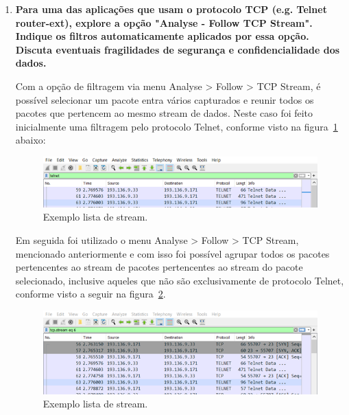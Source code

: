 \documentclass{llncs}
\begin{document}
  \begin{enumerate}[\textbf{c)}]
    \item \textbf{Para uma das aplicações que usam o protocolo TCP (e.g. Telnet router-ext), explore a opção "Analyse - Follow TCP Stream". Indique os filtros automaticamente aplicados por essa opção. Discuta eventuais fragilidades
    de segurança e confidencialidade dos dados.}
    
    \vspace{5mm}
    \begin{flushleft}
      \par Com a opção de filtragem via menu Analyse > Follow > TCP Stream, é possível selecionar um pacote entra vários capturados e reunir todos os pacotes que pertencem ao mesmo stream de dados. Neste caso foi feito inicialmente uma filtragem pelo protocolo Telnet, conforme visto na figura~\ref{fig:stream1} abaixo:
      \begin{figure}[h]
        \includegraphics[scale=0.65]{stream1.png}
        \centering
        \caption{Exemplo lista de stream.}
        \label{fig:stream1}
      \end{figure}
    \end{flushleft}

    \begin{flushleft}
      \par Em seguida foi utilizado o menu Analyse > Follow > TCP Stream, mencionado anteriormente e com isso foi possível agrupar todos os pacotes pertencentes ao stream de pacotes pertencentes ao stream do pacote selecionado, inclusive aqueles que não são exclusivamente de protocolo Telnet, conforme visto a seguir na figura~\ref{fig:stream2}.
      \begin{figure}[h]
        \includegraphics[scale=0.65]{stream2.png}
        \centering
        \caption{Exemplo lista de stream.}
        \label{fig:stream2}
      \end{figure}
    \end{flushleft}


\end{enumerate}
\end{document}
